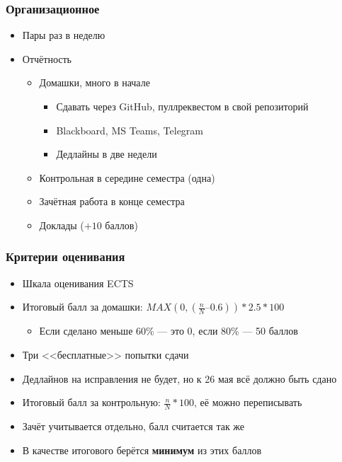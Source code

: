 \documentclass{../../slides-style}
\begin{document}
    \begin{frame}
        \frametitle{Организационное}
        \begin{itemize}
            \item Пары раз в неделю
            \item Отчётность
            \begin{itemize}
                \item Домашки, много в начале
                \begin{itemize}
                    \item Сдавать через GitHub, пуллреквестом в свой репозиторий
                    \item Blackboard, MS Teams, Telegram
                    \item Дедлайны в две недели
                \end{itemize}
                \item Контрольная в середине семестра (одна)
                \item Зачётная работа в конце семестра
                \item Доклады ($+10$ баллов)
            \end{itemize}
        \end{itemize}
    \end{frame}

    \begin{frame}
        \frametitle{Критерии оценивания}
        \begin{itemize}
            \item Шкала оценивания ECTS
            \item Итоговый балл за домашки: $MAX(0, (\frac{n}{N} – 0.6)) * 2.5 * 100$
            \begin{itemize}
                \item Если сделано меньше 60\% --- это 0, если 80\% --- 50 баллов
            \end{itemize}
            \item Три <<бесплатные>> попытки сдачи
            \item Дедлайнов на исправления не будет, но к 26 мая всё должно быть сдано
            \item Итоговый балл за контрольную: $\frac{n}{N} * 100$, её можно переписывать
            \item Зачёт учитывается отдельно, балл считается так же
            \item В качестве итогового берётся \textbf{минимум} из этих баллов
        \end{itemize}
    \end{frame}
\end{document}
